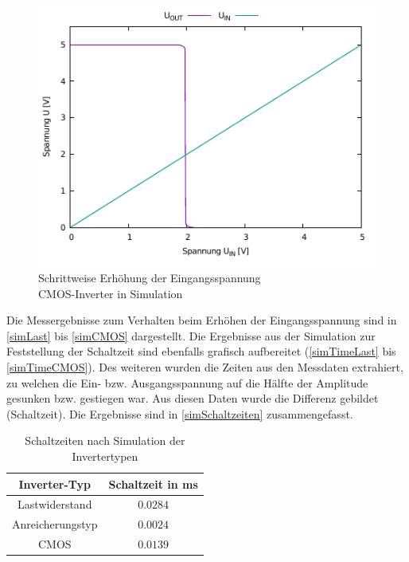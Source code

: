 \documentclass[11pt, a4paper]{article}
\begin{document}
\begin{figure}
    \centering
    \includegraphics[width=\linewidth]{simCMOS.pdf}
    \caption{Schrittweise Erhöhung der Eingangsspannung \\ CMOS-Inverter in Simulation}
    \label{simCMOS}
\end{figure}
Die Messergebnisse zum Verhalten beim Erhöhen der Eingangsspannung sind in \autoref{simLast} bis \autoref{simCMOS} dargestellt. 
Die Ergebnisse aus der Simulation zur Feststellung der Schaltzeit sind ebenfalls grafisch aufbereitet (\autoref{simTimeLast}  bis \autoref{simTimeCMOS}). Des weiteren wurden die Zeiten aus den Messdaten extrahiert, zu welchen die Ein- bzw. Ausgangsspannung auf die Hälfte der Amplitude gesunken bzw. gestiegen war. Aus diesen Daten wurde die Differenz gebildet (Schaltzeit). Die Ergebnisse sind in \autoref{simSchaltzeiten} zusammengefasst.
\begin{table}[h]
\centering
\begin{tabular}{c|c}
Inverter-Typ & Schaltzeit in ms \\ \hline
Lastwiderstand & $0.0284$ \\
Anreicherungstyp & $0.0024$ \\
CMOS & $0.0139$
\end{tabular}
\caption{Schaltzeiten nach Simulation der Invertertypen}
\label{simSchaltzeiten}
\end{table}
\end{document}
